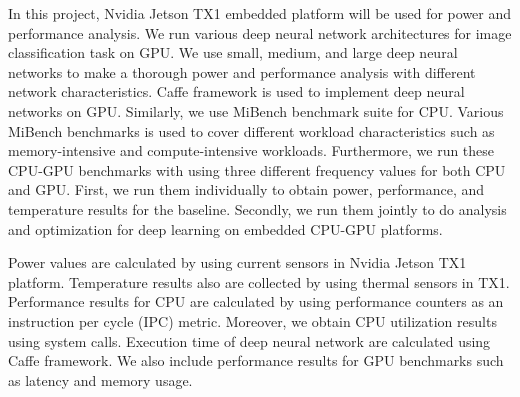 In this project, Nvidia Jetson TX1 embedded platform will be used for power and performance analysis. We run various deep neural network architectures for image classification task on GPU. We use small, medium, and large deep neural networks to make a thorough power and performance analysis with different network characteristics. Caffe framework \cite{caffe} is used to implement deep neural networks on GPU. Similarly, we use MiBench benchmark suite for CPU. Various MiBench benchmarks is used to cover different workload characteristics such as memory-intensive and compute-intensive workloads. Furthermore, we run these CPU-GPU benchmarks with using three different frequency values for both CPU and GPU. First, we run them individually to obtain power, performance, and temperature results for the baseline. Secondly, we run them jointly to do analysis and optimization for deep learning on embedded CPU-GPU platforms.

Power values are calculated by using current sensors in Nvidia Jetson TX1 platform. Temperature results also are collected by using thermal sensors in TX1. Performance results for CPU are calculated by using performance counters as an instruction per cycle (IPC) metric. Moreover, we obtain CPU utilization results using system calls. Execution time of deep neural network are calculated using Caffe framework. We also include performance results for GPU benchmarks such as latency and memory usage.